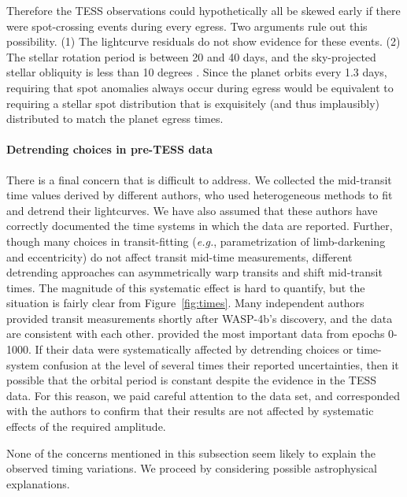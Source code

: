 \documentclass[12pt,twocolumn,tighten]{aastex62}
\begin{document}
{Therefore the TESS observations could hypothetically all be skewed
early if there were spot-crossing events during every egress.  Two
arguments rule out this possibility.  (1) The lightcurve residuals do
not show evidence for these events.  (2) The stellar rotation period
is between 20 and 40 days, and the sky-projected stellar obliquity is
less than 10 degrees
\citep{triaud_spin-orbit_2010,sanchis-ojeda_starspots_2011,hoyer_tramos_2013}.
Since the planet orbits every 1.3 days, requiring that spot anomalies
always occur during egress would be equivalent to requiring a stellar
spot distribution that is exquisitely (and thus implausibly)
distributed to match the planet egress times.

\paragraph{Detrending choices in pre-TESS data}
There is a final concern that is difficult to address.  We
collected the mid-transit time values derived by different
authors, who used heterogeneous methods to fit and detrend their
lightcurves.  We have also assumed that these authors
have correctly documented the time systems in which the data are
reported.  Further, though many
choices in transit-fitting ({\it e.g.}, parametrization of
limb-darkening and eccentricity) do not affect transit mid-time
measurements, different detrending approaches can asymmetrically warp
transits and shift mid-transit times.  The magnitude of this
systematic effect is hard to quantify, but the situation is fairly
clear from Figure~\ref{fig:times}.  Many independent authors provided
transit measurements shortly after WASP-4b's discovery, and the data are
consistent with each other. \citet{huitson_gemini_2017} provided
the most important data from epochs 0-1000. If their data were
systematically affected by detrending choices or time-system confusion
at the level of several
times their reported uncertainties, then it possible that the orbital
period is constant despite the evidence in the TESS data.
For this reason, we paid careful attention to the
\citet{huitson_gemini_2017} data set, and corresponded with the authors
to confirm that their results are not affected by systematic 
effects of the required amplitude.

None of the concerns mentioned in this subsection seem likely
to explain the observed timing variations. We proceed by
considering possible astrophysical explanations.

}
\end{document}
